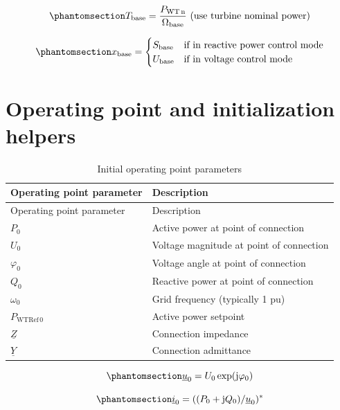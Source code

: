 \documentclass[
  a4paper,
  DIV=11,
  numbers=noendperiod]{scrartcl}
\begin{document}
\begin{equation}\phantomsection\label{eq-tBase}{ 
T_\mathrm{base} = \dfrac{P_\mathrm{WT\,n}}{\Omega_\mathrm{base}} \mbox{ (use turbine nominal power)}
}\end{equation}

\begin{equation}\phantomsection\label{eq-xBase}{ 
x_\mathrm{base} = 
\begin{cases}
S_\mathrm{base} &\mbox{if in reactive power control mode}\\
U_\mathrm{base} &\mbox{if in voltage control mode}
\end{cases}
}\end{equation}

\section{Operating point and initialization
helpers}\label{sec-initHelpersGlobal}

\begin{longtable}[]{@{}ll@{}}
\caption{Initial operating point parameters}\tabularnewline
\toprule\noalign{}
Operating point parameter & Description \\
\midrule\noalign{}
\endfirsthead
\toprule\noalign{}
Operating point parameter & Description \\
\midrule\noalign{}
\endhead
\bottomrule\noalign{}
\endlastfoot
\(P_\mathrm{0}\) & Active power at point of connection \\
\(U_\mathrm{0}\) & Voltage magnitude at point of connection \\
\(\varphi_\mathrm{0}\) & Voltage angle at point of connection \\
\(Q_\mathrm{0}\) & Reactive power at point of connection \\
\(\omega_0\) & Grid frequency (typically 1 pu) \\
\(P_\mathrm{WTRef\,0}\) & Active power setpoint \\
\(\underline{Z}\) & Connection impedance \\
\(\underline{Y}\) & Connection admittance \\
\end{longtable}

\begin{equation}\phantomsection\label{eq-u0}{
\underline{u}_0 =  U_0 \exp (\mathrm{j}\varphi_\mathrm{0})
}\end{equation}

\begin{equation}\phantomsection\label{eq-i0}{
\underline{i}_0 =  ((P_0 + \mathrm{j}Q_0)/\underline{u}_0)^*
}\end{equation}
\end{document}
